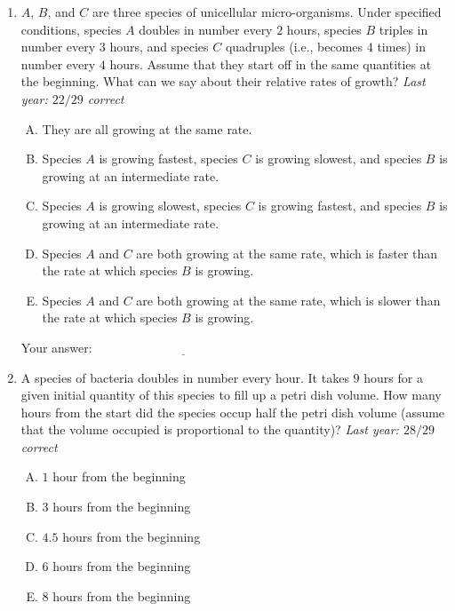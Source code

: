 \documentclass[10pt]{amsart}
\begin{document}
\begin{enumerate}
\item $A$, $B$, and $C$ are three species of unicellular
  micro-organisms. Under specified conditions, species $A$ doubles in
  number every $2$ hours, species $B$ triples in number every $3$
  hours, and species $C$ quadruples (i.e., becomes $4$ times) in
  number every $4$ hours. Assume that they start off in the same
  quantities at the beginning. What can we say about their relative
  rates of growth? {\em Last year: $22/29$ correct}
  \begin{enumerate}[(A)]
  \item They are all growing at the same rate.
  \item Species $A$ is growing fastest, species $C$ is growing
    slowest, and species $B$ is growing at an intermediate rate.
  \item Species $A$ is growing slowest, species $C$ is growing
    fastest, and species $B$ is growing at an intermediate rate.
  \item Species $A$ and $C$ are both growing at the same rate, which
    is faster than the rate at which species $B$ is growing.
  \item Species $A$ and $C$ are both growing at the same rate, which
    is slower than the rate at which species $B$ is growing.
  \end{enumerate}

  \vspace{0.1in}
  Your answer: $\underline{\qquad\qquad\qquad\qquad\qquad\qquad\qquad}$
  \vspace{0.1in}

\item A species of bacteria doubles in number every hour. It takes $9$
  hours for a given initial quantity of this species to fill up a
  petri dish volume. How many hours from the start did the species
  occup half the petri dish volume (assume that the volume occupied is
  proportional to the quantity)? {\em Last year: $28/29$ correct}

  \begin{enumerate}[(A)]
  \item $1$ hour from the beginning
  \item $3$ hours from the beginning
  \item $4.5$ hours from the beginning
  \item $6$ hours from the beginning
  \item $8$ hours from the beginning
  \end{enumerate}


\end{enumerate}
\end{document}
